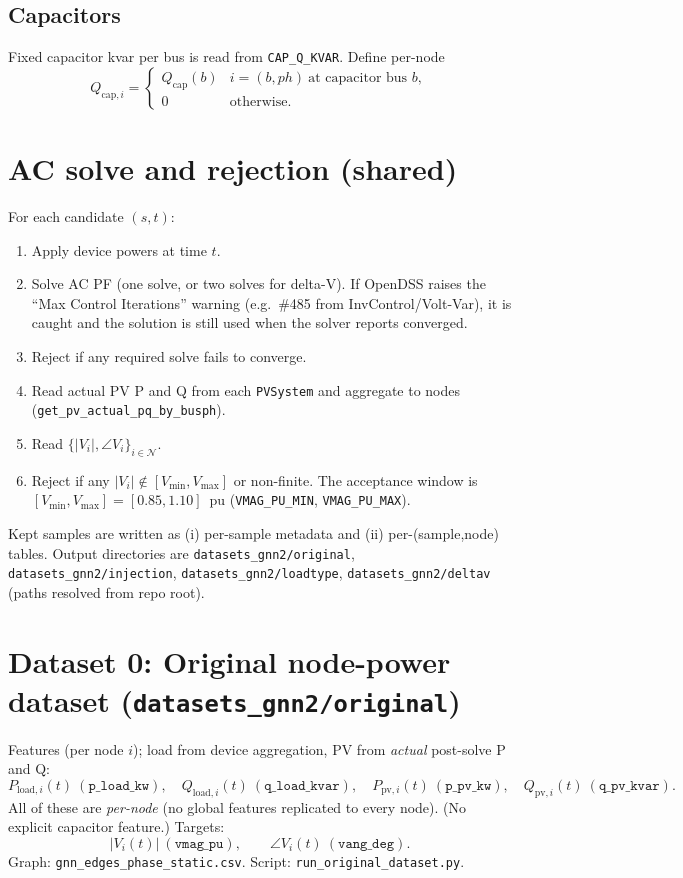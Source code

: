 \documentclass[11pt]{article}
\begin{document}
\subsection*{Capacitors}

Fixed capacitor kvar per bus is read from \texttt{CAP\_Q\_KVAR}. Define per-node
\[
Q_{\mathrm{cap},i}=\begin{cases}
Q_{\mathrm{cap}}(b) & i=(b,ph)\ \text{at capacitor bus }b,\\
0 & \text{otherwise.}
\end{cases}
\]

\section{AC solve and rejection (shared)}

For each candidate $(s,t)$:
\begin{enumerate}[noitemsep]
\item Apply device powers at time $t$.
\item Solve AC PF (one solve, or two solves for delta-V). If OpenDSS raises the ``Max Control Iterations'' warning (e.g.\ \#485 from InvControl/Volt-Var), it is caught and the solution is still used when the solver reports converged.
\item Reject if any required solve fails to converge.
\item Read actual PV P and Q from each \texttt{PVSystem} and aggregate to nodes (\texttt{get\_pv\_actual\_pq\_by\_busph}).
\item Read $\{|V_i|,\angle V_i\}_{i\in\mathcal{N}}$.
\item Reject if any $|V_i|\notin[V_{\min},V_{\max}]$ or non-finite. The acceptance window is $[V_{\min},V_{\max}]=[0.85,1.10]$~pu (\texttt{VMAG\_PU\_MIN}, \texttt{VMAG\_PU\_MAX}).
\end{enumerate}
Kept samples are written as (i) per-sample metadata and (ii) per-(sample,node) tables. Output directories are \texttt{datasets\_gnn2/original}, \texttt{datasets\_gnn2/injection}, \texttt{datasets\_gnn2/loadtype}, \texttt{datasets\_gnn2/deltav} (paths resolved from repo root).

\section{Dataset 0: Original node-power dataset (\texttt{datasets\_gnn2/original})}

Features (per node $i$); load from device aggregation, PV from \emph{actual} post-solve P and Q:
\[
P_{\mathrm{load},i}(t)\ (\texttt{p\_load\_kw}),\quad
Q_{\mathrm{load},i}(t)\ (\texttt{q\_load\_kvar}),\quad
P_{\mathrm{pv},i}(t)\ (\texttt{p\_pv\_kw}),\quad
Q_{\mathrm{pv},i}(t)\ (\texttt{q\_pv\_kvar}).
\]
All of these are \emph{per-node} (no global features replicated to every node). (No explicit capacitor feature.) Targets:
\[
|V_i(t)|\ (\texttt{vmag\_pu}),\qquad \angle V_i(t)\ (\texttt{vang\_deg}).
\]
Graph: \texttt{gnn\_edges\_phase\_static.csv}. Script: \texttt{run\_original\_dataset.py}.
\end{document}
